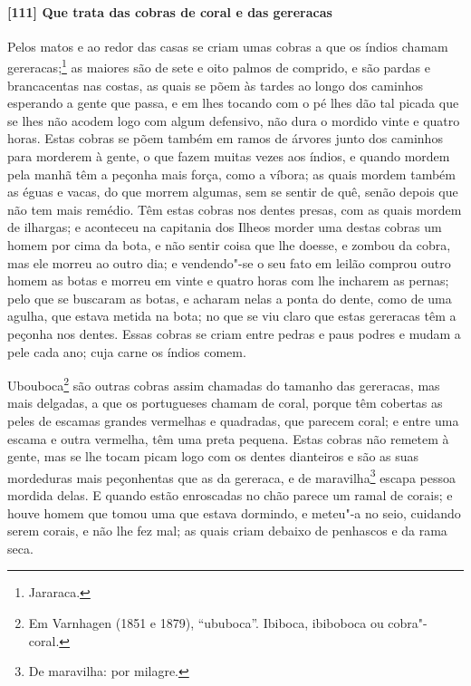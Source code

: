 \paragraph{[111] Que trata das cobras de coral e das gereracas}\quad
Pelos matos e ao redor das casas se criam umas cobras a que os índios chamam
gereracas;\footnote{ Jararaca.} as maiores são de sete e oito palmos de comprido, e são
pardas e brancacentas nas costas, as quais se põem às tardes ao longo dos caminhos
esperando a gente que passa, e em lhes tocando com o pé lhes dão tal picada que se lhes
não acodem logo com algum defensivo, não dura o mordido vinte e quatro horas. Estas cobras
se põem também em ramos de árvores junto dos caminhos para morderem à gente, o que fazem
muitas vezes aos índios, e quando mordem pela manhã têm a peçonha mais força, como a
víbora; as quais mordem também as éguas e vacas, do que morrem algumas, sem se sentir de
quê, senão depois que não tem mais remédio. Têm estas cobras nos dentes presas, com as
quais mordem de ilhargas; e aconteceu na capitania dos Ilheos morder uma destas cobras um
homem por cima da bota, e não sentir coisa que lhe doesse, e zombou da cobra, mas ele
morreu ao outro dia; e vendendo"-se o seu fato em leilão comprou outro homem as botas e
morreu em vinte e quatro horas com lhe incharem as pernas; pelo que se buscaram as botas, e
acharam nelas a ponta do dente, como de uma agulha, que estava metida na bota; no que se
viu claro que estas gereracas têm a peçonha nos dentes. Essas cobras se criam entre pedras
e paus podres e mudam a pele cada ano; cuja carne os índios comem.

Ubouboca\footnote{ Em Varnhagen (1851 e 1879), ``ububoca''. Ibiboca, ibiboboca ou
cobra"-coral.} são outras cobras assim chamadas do tamanho das gereracas, mas mais
delgadas, a que os portugueses chamam de coral, porque têm cobertas as peles de escamas
grandes vermelhas e quadradas, que parecem coral; e entre uma
escama e outra vermelha, têm uma preta pequena. Estas cobras não remetem à gente, mas se
lhe tocam picam logo com os dentes dianteiros e são as suas mordeduras mais peçonhentas
que as da gereraca, e de maravilha\footnote{ De maravilha: por milagre.} escapa pessoa
mordida delas. E quando estão enroscadas no chão parece um ramal de corais; e houve homem
que tomou uma que estava dormindo, e meteu"-a no seio, cuidando serem corais, e não lhe fez
mal; as quais criam debaixo de penhascos e da rama seca.


